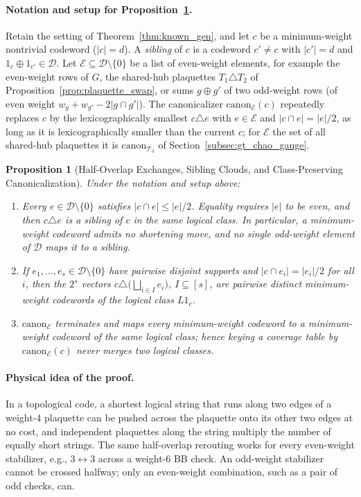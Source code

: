 \documentclass[12pt]{article}
\newtheorem{proposition}{Proposition}
\theoremstyle{definition}
\newcommand{\Dc}{\mathcal{D}}
\newcommand{\Tc}{\mathcal{T}_3}
\begin{document}
\paragraph{Notation and setup for Proposition~\ref{prop:even_swaps}.}
Retain the setting of Theorem~\ref{thm:known_gen}, and let $c$ be a minimum-weight nontrivial codeword ($|c| = d$).
A \emph{sibling} of $c$ is a codeword $c' \neq c$ with $|c'| = d$ and $1_c \oplus 1_{c'} \in \Dc$. Let $\mathcal{E}
\subseteq \Dc \setminus \{0\}$ be a list of even-weight elements, for example the even-weight rows of $G$, the
shared-hub plaquettes $T_1 \triangle T_2$ of Proposition~\ref{prop:plaquette_swap}, or sums $g \oplus g'$ of two
odd-weight rows (of even weight $w_g + w_{g'} - 2|g \cap g'|$). The canonicalizer $\mathrm{canon}_{\mathcal{E}}(c)$
repeatedly replaces $c$ by the lexicographically smallest $c \triangle e$ with $e \in \mathcal{E}$ and $|c \cap e| =
|e|/2$, as long as it is lexicographically smaller than the current $c$; for $\mathcal{E}$ the set of all shared-hub
plaquettes it is $\mathrm{canon}_{\Tc}$ of Section~\ref{subsec:gt_chao_gauge}.

\begin{proposition}[Half-Overlap Exchanges, Sibling Clouds, and Class-Preserving Canonicalization]
  \label{prop:even_swaps}
Under the notation and setup above:
\begin{enumerate}[label=(\alph*)]
  \item Every $e \in \Dc \setminus \{0\}$ satisfies $|c \cap e| \le |e|/2$. Equality requires $|e|$ to be even, and
    then $c \triangle e$ is a sibling of $c$ in the same logical class. In particular, a minimum-weight codeword admits
    no shortening move, and no single odd-weight element of $\Dc$ maps it to a sibling.
  \item If $e_1, \dots, e_s \in \Dc \setminus \{0\}$ have pairwise disjoint supports and $|c \cap e_i| = |e_i|/2$ for
    all $i$, then the $2^s$ vectors $c \triangle \bigl(\bigsqcup_{i \in I} e_i\bigr)$, $I \subseteq [s]$, are pairwise
    distinct minimum-weight codewords of the logical class $L 1_c$.
  \item $\mathrm{canon}_{\mathcal{E}}$ terminates and maps every minimum-weight codeword to a minimum-weight codeword of
    the same logical class; hence keying a coverage table by $\mathrm{canon}_{\mathcal{E}}(c)$ never merges two logical
    classes.
\end{enumerate}
\end{proposition}

\paragraph{Physical idea of the proof.}
In a topological code, a shortest logical string that runs along two edges of a weight-4 plaquette can be pushed
across the plaquette onto its other two edges at no cost, and independent plaquettes along the string multiply the
number of equally short strings. The same half-overlap rerouting works for every even-weight stabilizer, e.g., $3
\leftrightarrow 3$ across a weight-6 BB check. An odd-weight stabilizer cannot be crossed halfway; only an even-weight
combination, such as a pair of odd checks, can.
\end{document}
